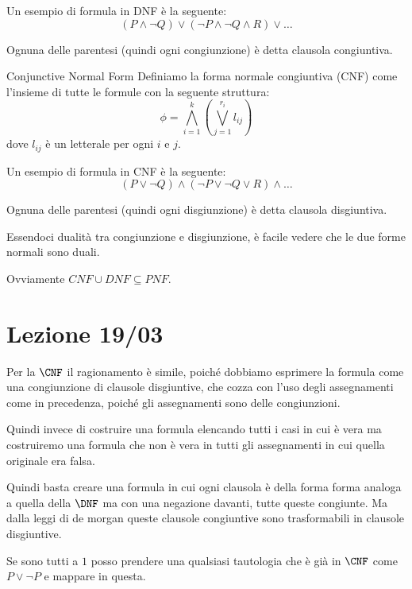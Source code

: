 \begin{example}{}
  Un esempio di formula in DNF è la seguente:
  \[(P\land \neg Q) \lor (\neg P \land \neg Q \land R) \lor \ldots\]

  Ognuna delle parentesi (quindi ogni congiunzione) è detta clausola congiuntiva.
\end{example}

\begin{definition}{Conjunctive Normal Form}
  Definiamo la forma normale congiuntiva (CNF) come l'insieme di tutte le formule con la seguente struttura:
  \[\phi = \bigwedge_{i=1}^k(\bigvee_{j=1}^{r_i} l_{ij})\]
  dove \(l_{ij}\) è un letterale per ogni \(i\) e \(j\).
\end{definition}

\begin{example}{}
  Un esempio di formula in CNF è la seguente:
  \[(P\lor \neg Q) \land (\neg P \lor \neg Q \lor R) \land \ldots\]

  Ognuna delle parentesi (quindi ogni disgiunzione) è detta clausola disgiuntiva.
\end{example}

Essendoci dualità tra congiunzione e disgiunzione, è facile vedere che le due forme normali sono duali.

Ovviamente \(CNF \cup DNF \subseteq PNF\).


\chapter{Lezione 19/03}

Per la \(\CNF\) il ragionamento è simile, poiché dobbiamo esprimere la formula come una congiunzione di clausole disgiuntive, che cozza con l'uso degli assegnamenti come in precedenza, poiché gli assegnamenti sono delle congiunzioni.

Quindi invece di costruire una formula elencando tutti i casi in cui è vera ma costruiremo una formula che non è vera in tutti gli assegnamenti in cui quella originale era falsa.

Quindi basta creare una formula in cui ogni clausola è della forma forma analoga a quella della \(\DNF\) ma con una negazione davanti, tutte queste congiunte. Ma dalla leggi di de morgan queste clausole congiuntive sono trasformabili in clausole disgiuntive.


Se sono tutti a \(1\) posso prendere una qualsiasi tautologia che è già in \(\CNF\) come \(P \lor \neg P\) e mappare in questa.

